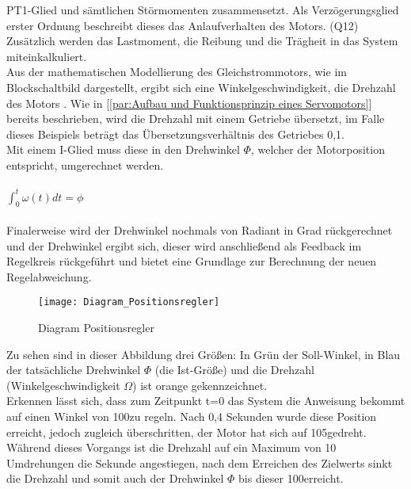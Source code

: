 \documentclass[titlepage,12pt,twoside]{article}
\begin{document}
PT1-Glied und sämtlichen Störmomenten zusammensetzt. Als Verzögerungsglied erster 
Ordnung beschreibt dieses das Anlaufverhalten des Motors. (Q12) Zusätzlich werden 
das Lastmoment, die Reibung und die Trägheit in das System miteinkalkuliert. \\
Aus der mathematischen Modellierung des Gleichstrommotors, wie im Blockschaltbild 
dargestellt, ergibt sich eine Winkelgeschwindigkeit, die Drehzahl des Motors \textquote{$\Omega$}.
Wie in [\textcolor{blue}{\autoref{par:Aufbau und Funktionsprinzip eines Servomotors}}] 
bereits beschrieben, wird die Drehzahl mit einem Getriebe übersetzt, im Falle dieses 
Beispiels beträgt das Übersetzungsverhältnis des Getriebes 0,1. \\
Mit einem I-Glied muss diese in den Drehwinkel $\Phi$, welcher der Motorposition 
entspricht, umgerechnet werden. \\
\\
$\int_{0}^{t} \omega(t)dt = \phi$ \\
\\
Finalerweise wird der Drehwinkel nochmals von Radiant in Grad rückgerechnet und der 
Drehwinkel ergibt sich, dieser wird anschließend als Feedback im Regelkreis 
rückgeführt und bietet eine Grundlage zur Berechnung der neuen Regelabweichung. \\
\begin{figure}[H]
	\begin{center}
		\scalebox{1.2}
		{\texttt{[image: Diagram\_Positionsregler]}}
		\caption{Diagram Positionsregler}
		\label{fig:Diagram_Poositionsregler}
	\end{center}
\end{figure}
\hfill \break
Zu sehen sind in dieser Abbildung drei Größen: In Grün der Soll-Winkel, in Blau der 
tatsächliche Drehwinkel $\Phi$ (die Ist-Größe) und die Drehzahl (Winkelgeschwindigkeit 
$\Omega$) ist orange gekennzeichnet. \\
Erkennen lässt sich, dass zum Zeitpunkt t=0 das System die Anweisung bekommt auf 
einen Winkel von 100\textdegree zu regeln. Nach 0,4 Sekunden wurde diese Position erreicht, 
jedoch zugleich überschritten, der Motor hat sich auf 105\textdegree gedreht. Während dieses 
Vorgangs ist die Drehzahl auf ein Maximum von 10 Umdrehungen die Sekunde angestiegen, nach dem 
Erreichen des Zielwerts sinkt die Drehzahl und somit auch der Drehwinkel $\Phi$ bis 
dieser 100\textdegree erreicht. \\
\\
\end{document}
